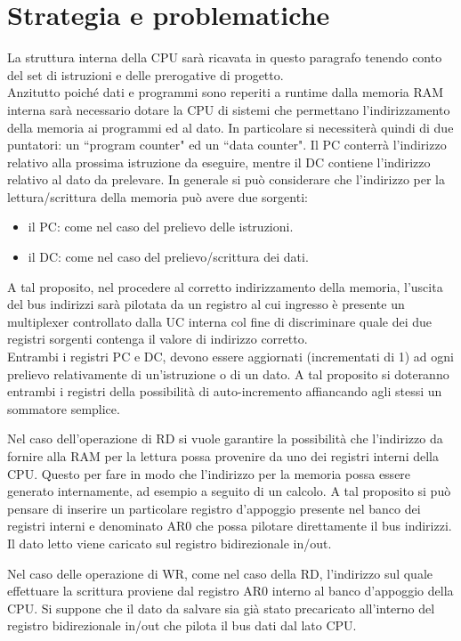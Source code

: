 \section{Strategia e problematiche}
La struttura interna della CPU sarà ricavata in questo paragrafo tenendo conto del set di istruzioni e delle prerogative di progetto.\\
Anzitutto poiché dati e programmi sono reperiti a runtime dalla memoria RAM interna sarà necessario dotare la CPU di sistemi che permettano l'indirizzamento della memoria ai programmi ed al dato. In particolare si necessiterà quindi di due puntatori: un \textquotedblleft program counter" ed un \textquotedblleft data counter". Il PC conterrà l'indirizzo relativo alla prossima istruzione da eseguire, mentre il DC contiene l'indirizzo relativo al dato da prelevare.
In generale si può considerare che l'indirizzo per la lettura/scrittura della memoria può avere due sorgenti:
\begin{itemize}
	\item il PC: come nel caso del prelievo delle istruzioni.
	\item il DC: come nel caso del prelievo/scrittura dei dati.
\end{itemize}
A tal proposito, nel procedere al corretto indirizzamento della memoria, l'uscita del bus indirizzi sarà pilotata da un registro al cui ingresso è presente un multiplexer controllato dalla UC interna col fine di discriminare quale dei due registri sorgenti contenga il valore di indirizzo corretto.\\
Entrambi i registri PC e DC, devono essere aggiornati (incrementati di 1) ad ogni prelievo relativamente di un'istruzione o di un dato. A tal proposito si doteranno entrambi i registri della possibilità di auto-incremento affiancando agli stessi un sommatore semplice.
\par \bigskip \noindent
Nel caso dell'operazione di RD si vuole garantire la possibilità che l'indirizzo da fornire alla RAM per la lettura possa provenire da uno dei registri interni della CPU. Questo per fare in modo che l'indirizzo per la memoria possa essere generato internamente, ad esempio a seguito di un calcolo. A tal proposito si può pensare di inserire un particolare registro d'appoggio presente nel banco dei registri interni e denominato AR0 che possa pilotare direttamente il bus indirizzi. Il dato letto viene caricato sul registro bidirezionale in/out.
\par \bigskip \noindent
Nel caso delle operazione di WR, come nel caso della RD, l'indirizzo sul quale effettuare la scrittura proviene dal registro AR0 interno al banco d'appoggio della CPU. Si suppone che il dato da salvare sia già stato precaricato all'interno del registro bidirezionale in/out che pilota il bus dati dal lato CPU.
